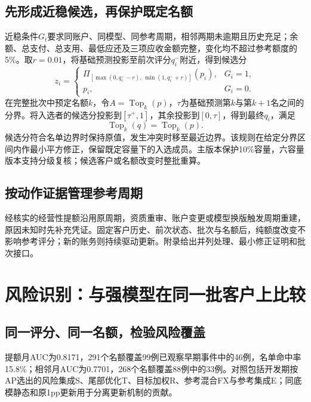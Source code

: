 
\subsection{先形成近稳候选，再保护既定名额}
近稳条件$G_t$要求同账户、同模型、同参考周期，相邻两期未逾期且历史充足；余额、总支付、总支用、最低应还及三项应收金额完整，变化均不超过参考额度的5\%。取$r=0.01$，将基础预测投影至前次评分$q_i^{-}$附近，得到候选分
\[
 z_i=\begin{cases}\Pi_{[\max(0,q_i^{-}-r),\,\min(1,q_i^{-}+r)]}(p_i),&G_i=1,\\p_i,&G_i=0.\end{cases}
\]
在完整批次中预定名额$k$，令$A=\operatorname{Top}_k(p)$，$\tau$为基础预测第$k$与第$k+1$名之间的分界。将入选者的候选分投影到$[\tau^{+},1]$，其余投影到$[0,\tau]$，得到最终$q_i$，满足
\[
\operatorname{Top}_k(q)=\operatorname{Top}_k(p).
\]
候选分符合名单边界时保持原值，发生冲突时移至最近边界。该规则在给定分界区间内作最小平方修正，保留既定容量下的入选成员。主版本保护10\%容量，六容量版本支持分级复核；候选客户或名额改变时整批重算。

\subsection{按动作证据管理参考周期}
经核实的经营性提额沿用原周期，资质重审、账户变更或模型换版触发周期重建，原因未知时先补充凭证。固定客户历史、前次状态、批次与名额后，纯额度改变不影响参考评分；新的账务则持续驱动更新。附录给出并列处理、最小修正证明和批次接口。

\clearpage
\section{风险识别：与强模型在同一批客户上比较}
\subsection{同一评分、同一名额，检验风险覆盖}
提额月AUC为0.8171，291个名额覆盖99例已观察早期事件中的46例，名单命中率15.8\%；相邻月AUC为0.7701，268个名额覆盖88例中的33例。对照包括开发期按AP选出的风险集成S、尾部优化T、目标加权R、参考混合FX与参考集成E；同底模静态和原1pp更新用于分离更新机制的贡献。




